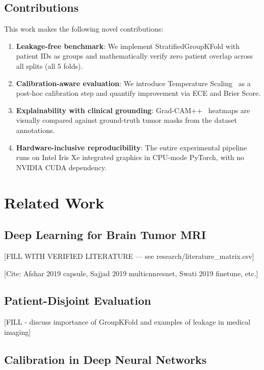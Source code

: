 \documentclass[journal]{IEEEtran}
\begin{document}
\subsection{Contributions}

This work makes the following novel contributions:
\begin{enumerate}
  \item \textbf{Leakage-free benchmark}: We implement StratifiedGroupKFold with patient IDs as
        groups and mathematically verify zero patient overlap across all splits (all 5 folds).
  \item \textbf{Calibration-aware evaluation}: We introduce Temperature Scaling~\cite{guo2017calibration}
        as a post-hoc calibration step and quantify improvement via ECE and Brier Score.
  \item \textbf{Explainability with clinical grounding}: Grad-CAM++~\cite{chattopadhay2018gradcampp}
        heatmaps are visually compared against ground-truth tumor masks from the dataset annotations.
  \item \textbf{Hardware-inclusive reproducibility}: The entire experimental pipeline runs on
        Intel Iris Xe integrated graphics in CPU-mode PyTorch, with no NVIDIA CUDA dependency.
\end{enumerate}

\section{Related Work}
\label{sec:related}

\subsection{Deep Learning for Brain Tumor MRI}

[FILL WITH VERIFIED LITERATURE — see research/literature_matrix.csv]

[Cite: Afshar 2019 capsule, Sajjad 2019 multicnnresnet, Swati 2019 finetune, etc.]

\subsection{Patient-Disjoint Evaluation}

[FILL - discuss importance of GroupKFold and examples of leakage in medical imaging]

\subsection{Calibration in Deep Neural Networks}
\end{document}
